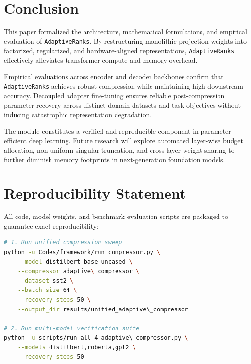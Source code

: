 \section{Conclusion}
This paper formalized the architecture, mathematical formulations, and empirical evaluation of \texttt{AdaptiveRanks}. By restructuring monolithic projection weights into factorized, regularized, and hardware-aligned representations, \texttt{AdaptiveRanks} effectively alleviates transformer compute and memory overhead.

Empirical evaluations across encoder and decoder backbones confirm that \texttt{AdaptiveRanks} achieves robust compression while maintaining high downstream accuracy. Decoupled adapter fine-tuning ensures reliable post-compression parameter recovery across distinct domain datasets and task objectives without inducing catastrophic representation degradation.

The module constitutes a verified and reproducible component in parameter-efficient deep learning. Future research will explore automated layer-wise budget allocation, non-uniform singular truncation, and cross-layer weight sharing to further diminish memory footprints in next-generation foundation models.


\section{Reproducibility Statement}
All code, model weights, and benchmark evaluation scripts are packaged to guarantee exact reproducibility:
\begin{lstlisting}[language=bash]
# 1. Run unified compression sweep
python -u Codes/framework/run_compressor.py \
    --model distilbert-base-uncased \
    --compressor adaptive\_compressor \
    --dataset sst2 \
    --batch_size 64 \
    --recovery_steps 50 \
    --output_dir results/unified_adaptive\_compressor

# 2. Run multi-model verification suite
python -u scripts/run_all_4_adaptive\_compressor.py \
    --models distilbert,roberta,gpt2 \
    --recovery_steps 50
\end{lstlisting}


